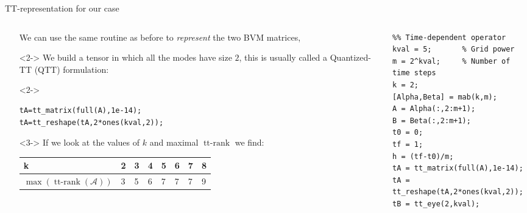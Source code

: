 \documentclass[aspectratio=169,xcolor=dvipsnames]{beamer}
\begin{document}
\begin{frame}[fragile]{\faTrain\;TT-representation for our case}

\begin{columns}
\begin{column}{0.5\columnwidth}
\begin{itemize}
	\item[\faCog] We can use the same routine as before to \emph{represent} the two BVM matrices,
	\item[\faCog]<2-> We build a tensor in which all the modes have size $2$, this is usually called a Quantized-TT (QTT) formulation:
\begin{onlyenv}<2->
\begin{verbatim}
tA=tt_matrix(full(A),1e-14);
tA=tt_reshape(tA,2*ones(kval,2));
\end{verbatim} 
\end{onlyenv}
	\item[\faHammer]<3-> If we look at the values of $k$ and maximal $\operatorname{tt-rank}$ we find:\\[1em]
	
	\begin{tabular}{l|lllllll}
	k & 2 & 3 & 4 & 5 & 6 & 7 & 8 \\\midrule
	$\max(\operatorname{tt-rank}(\mathcal{A}))$ & 3 & 5 & 6 & 7 & 7 & 7 & 9 \\
	\end{tabular}
\end{itemize}
\end{column}
\begin{column}{0.5\columnwidth}
\begin{verbatim}
%% Time-dependent operator
kval = 5;       % Grid power
m = 2^kval;     % Number of time steps
k = 2;
[Alpha,Beta] = mab(k,m);
A = Alpha(:,2:m+1);
B = Beta(:,2:m+1);
t0 = 0;
tf = 1;
h = (tf-t0)/m;
tA = tt_matrix(full(A),1e-14);
tA = tt_reshape(tA,2*ones(kval,2));
tB = tt_eye(2,kval);
\end{verbatim}
\end{column}
\end{columns}

\end{frame}
\end{document}
